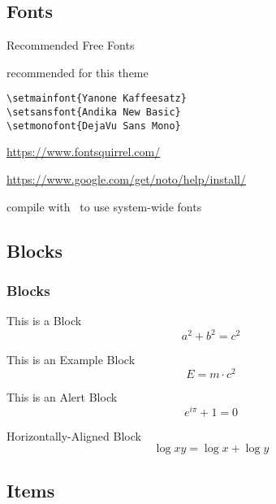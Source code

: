 \documentclass[compress,aspectratio=169, table]{beamer}
\begin{document}
\subsection{Fonts}

\begin{frame}[fragile]{Recommended Free Fonts}
  \begin{description}
  \item[Selected Fonts] recommended for this theme\\
    \begin{lstlisting}[basicstyle = \ttfamily\small]
\setmainfont{Yanone Kaffeesatz}
\setsansfont{Andika New Basic}
\setmonofont{DejaVu Sans Mono}
    \end{lstlisting}
  \item[Download] {\small \url{https://www.fontsquirrel.com/}}
  \item[Install Fonts] {\small \url{https://www.google.com/get/noto/help/install/}}
  \item[Compilation] compile with \XeLaTeX~to use system-wide fonts
  \end{description}

\end{frame}


\subsection{Blocks}

\begin{frame}
  \frametitle{Blocks}
  \begin{block}{This is a Block}
    \[
      a^2 + b^2 = c^2
    \]
  \end{block}
  \begin{exampleblock}{This is an Example Block}
    \[
      E = m \cdot c^{2}
    \]
  \end{exampleblock}
  \begin{alertblock}{This is an Alert Block}
    \[
      e^{i\pi} + 1 = 0
    \]
  \end{alertblock}

  \centering
  \begin{minipage}{1.0\linewidth}
    \begin{block}{Horizontally-Aligned Block}
      \[
        \log xy = \log x + \log y
      \]
    \end{block}
  \end{minipage}
\end{frame}

\subsection{Items}
\end{document}
